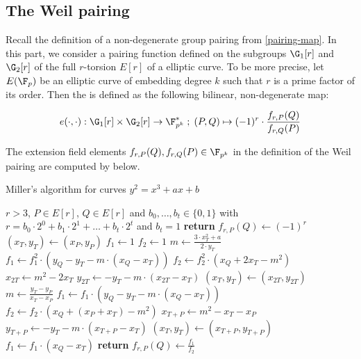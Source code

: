 \subsection{The Weil pairing}
\label{sec:weil-pairing} Recall the definition of a non-degenerate group pairing from \ref{pairing-map}. In this part, we consider a pairing function defined on
the subgroups $\G_1[r]$ and $\G_2[r]$ of the full $r$-torsion $E[r]$ of a  elliptic curve. To be more precise, let $E(\F_p)$ be an elliptic curve of embedding degree $k$ such that $r$ is a prime factor of its order. Then the  is defined as the following bilinear, non-degenerate map:

\begin{equation}\label{eq:weil-pairing}
e(\cdot,\cdot) : \G_1[r] \times \G_2[r] \to \F^*_{p^k}\; ;\; 
(P,Q)\mapsto (-1)^r \cdot \frac{f_{r,P}(Q)}{f_{r,Q}(P)}
\end{equation} 

The extension field elements $f_{r,P}(Q), f_{r,Q}(P)\in \F_{p^k}$ in the definition of the Weil pairing are computed by  below.

\begin{algorithm}\caption{Miller's algorithm for  curves $y^2 = x^3 +ax +b$}\label{alg:millersalgo}
\begin{algorithmic}[0]
\Require $r>3$, $P \in E[r]$, $Q\in E[r]$ and
\State $b_0,\ldots, b_t\in \{0,1\}$ with $r= b_0\cdot 2^0 + b_1\cdot 2^1 + \ldots + b_t\cdot 2^t$ and $b_t=1$
	\State \textbf{return} $f_{r,P}(Q) \gets (-1)^r$
\EndIf
\State $(x_T,y_T) \gets (x_P,y_P)$
\State $f_1\gets 1$
\State $f_2\gets 1$
	\State $m \gets \frac{3\cdot x_T^2+a}{2\cdot y_T}$	
    \State $f_1 \gets f_1^2\cdot (y_Q - y_T - m\cdot(x_Q-x_T))$
	\State $f_2 \gets f_2^2\cdot (x_Q + 2x_T -m^2)$
	\State $x_{2T} \gets m^2 - 2 x_T$
	\State $y_{2T} \gets -y_T - m\cdot (x_{2T}-x_T)$
	\State $(x_T,y_T)\gets (x_{2T},y_{2T})$ 
		\State $m \gets \frac{y_T -y_P}{x_T - x_P}$
		\State $f_1 \gets f_1\cdot (y_Q -y_T -m\cdot (x_Q - x_T))$
		\State $f_2 \gets f_2\cdot (x_Q + (x_P+x_T) - m^2)$
		\State $x_{T+P} \gets m^2 -x_T -x_P$
		\State $y_{T+P}\gets -y_T - m\cdot (x_{T+P}-x_T)$
		\State $(x_T,y_T)\gets (x_{T+P},y_{T+P})$
	\EndIf
\EndFor
\State $f_1 \gets f_1\cdot (x_Q - x_T)$
\State \textbf{return} $f_{r,P}(Q) \gets \frac{f_1}{f_2}$
\EndProcedure
\end{algorithmic}
\end{algorithm}

